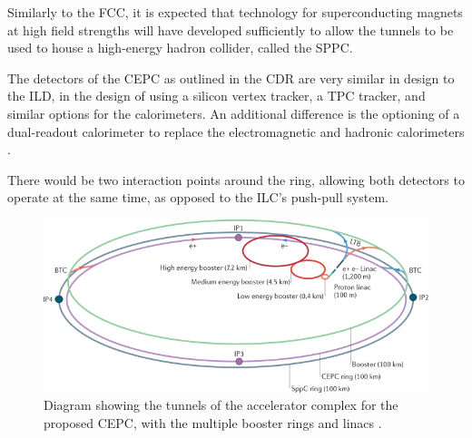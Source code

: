 Similarly to the \acrshort{FCC}, it is expected that technology for superconducting magnets at high field strengths will have developed sufficiently to allow the tunnels to be used to house a high-energy hadron collider, called the \acrfull{SPPC}. 

The detectors of the \acrshort{CEPC} as outlined in the \acrshort{CDR} are very similar in design to the \acrshort{ILD}, in the design of using a silicon vertex tracker, a \acrshort{TPC} tracker, and similar options for the calorimeters. An additional difference is the optioning of a dual-readout calorimeter to replace the electromagnetic and hadronic calorimeters \cite{cepc-cdr-physicsanddetector}.

There would be two interaction points around the ring, allowing both detectors to operate at the same time, as opposed to the \acrshort{ILC}'s push-pull system.

\begin{figure}[h]
	\centering
	\includegraphics[width=1.0\textwidth]{../Pictures/CEPC-Scale.png}
	\caption{Diagram showing the tunnels of the accelerator complex for the proposed \acrlong{CEPC}, with the multiple booster rings and linacs \cite{cepc-schematic}.}
	\label{figure:colliders/CEPC/main}
\end{figure}

